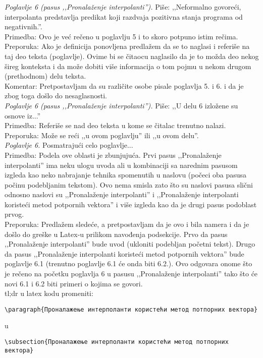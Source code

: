 \documentclass[a4paper]{report}
\begin{document}
\textit{Poglavlje 6 (pasus ,,Pronalaženje interpolanti'').} Piše: ,,Neformalno govoreći, interpolanta predstavlja predikat koji razdvaja pozitivna stanja programa od negativnih.''. \\
\indent Primedba: Ovo je već rečeno u poglavlju 5 i to skoro potpuno istim rečima. \\
\indent Preporuka: Ako je definicija ponovljena predlažem da se to naglasi i referiše na taj deo teksta (poglavlje). Ovime bi se čitaocu naglasilo da je to možda deo nekog šireg konteksta i da može dobiti više informacija o tom pojmu u nekom drugom (prethodnom) delu teksta. \\
\indent Komentar: Pretpostavljam da su različite osobe pisale poglavlja 5. i 6. i da je zbog toga došlo do nesaglasnosti. \\

\textit{Poglavlje 6 (pasus ,,Pronalaženje interpolanti'').} Piše: ,,U delu 6 izložene su osnove iz...'' \\
\indent Primedba: Referiše se nad deo teksta u kome se čitalac trenutno nalazi. \\
\indent Preporuka: Može se reći ,,u ovom poglavlju'' ili ,,u ovom delu''. \\

\textit{Poglavlje 6.} Posmatrajući celo poglavlje... \\
\indent Primedba: Podela ove oblasti je zbunjujuća. Prvi pasus ,,Pronalaženje interpolanti'' ima neku ulogu uvoda ali u kombinaciji sa narednim pasusom izgleda kao neko nabrajanje tehnika spomenutih u naslovu (počeci oba pasusa počinu podebljanim tekstom). Ovo nema smisla zato što su naslovi pasusa slični odnosno naslovi su ,,Pronalaženje interpolanti'' i  ,,Pronalaženje interpolanti koristeći metod potpornih vektora'' i više izgleda kao da je drugi pasus podoblast prvog. \\
\indent Preporuka: Predlažem sledeće, a pretpostavljam da je ovo i bila namera i da je došlo do greške u Latex-u prilikom navođenja podsekcije. Prvo da pasus ,,Pronalaženje interpolanti'' bude uvod (ukloniti podebljan početni tekst). Drugo da pasus ,,Pronalaženje interpolanti koristeći metod potpornih vektora'' bude poglavlje 6.1 (trenutno poglavlje 6.1 će onda biti 6.2.). Ovo odgovara onome što je rečeno na početku poglavlja 6 u pasusu ,,Pronalaženje interpolanti'' tako što će novi 6.1 i 6.2 biti primeri o kojima se govori. \\
tl;dr u latex kodu promeniti:
\begin{verbatim}
\paragraph{Проналажење интерполанти користећи метод потпорних вектора}
\end{verbatim}
u
\begin{verbatim}
\subsection{Проналажење интерполанти користећи метод потпорних вектора}
\end{verbatim}
\end{document}
